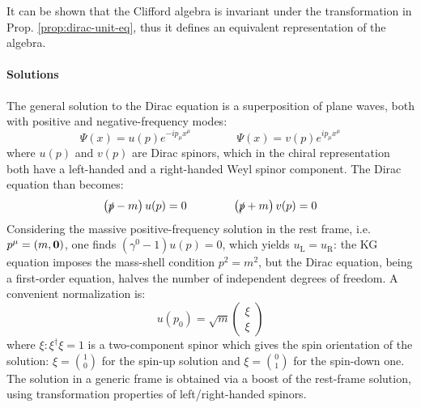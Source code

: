 It can be shown that the Clifford algebra is invariant under the transformation in Prop. \ref{prop:dirac-unit-eq}, thus it defines an equivalent representation of the algebra.

\paragraph{Solutions}

The general solution to the Dirac equation is a superposition of plane waves, both with positive and negative-frequency modes:
\begin{equation*}
  \Psi(x) = u(p) e^{-i p_\mu x^\mu}
  \qquad \qquad
  \Psi(x) = v(p) e^{i p_\mu x^\mu}
\end{equation*}
where $ u(p) $ and $ v(p) $ are Dirac spinors, which in the chiral representation both have a left-handed and a right-handed Weyl spinor component. The Dirac equation than becomes:
\begin{equation*}
  \left( \slashed{p} - m \right) u(p) = 0
  \qquad \qquad
  \left( \slashed{p} + m \right) v(p) = 0
\end{equation*}
Considering the massive positive-frequency solution in the rest frame, i.e. $ p^\mu = (m, \mathbf{0}) $, one finds $ (\gamma^0 - 1) u(p) = 0 $, which yields $ u_\text{L} = u_\text{R} $: the KG equation imposes the mass-shell condition $ p^2 = m^2 $, but the Dirac equation, being a first-order equation, halves the number of independent degrees of freedom. A convenient normalization is:
\begin{equation*}
  u(p_0) = \sqrt{m}
  \begin{pmatrix}
    \xi \\ \xi
  \end{pmatrix}
\end{equation*}
where $ \xi : \xi^\dagger \xi = 1 $ is a two-component spinor which gives the spin orientation of the solution: $ \xi = \binom{1}{0} $ for the spin-up solution and $ \xi = \binom{0}{1} $ for the spin-down one.\\
The solution in a generic frame is obtained via a boost of the rest-frame solution, using transformation properties of left/right-handed spinors.

